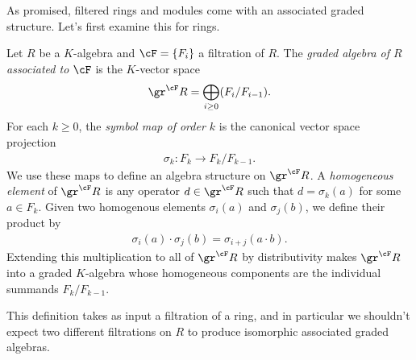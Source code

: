As promised, filtered rings and modules come with an associated graded structure. Let's first examine this for rings.

\begin{defn}\label{defn:associated-grading-rng}
	Let $R$ be a $K$-algebra and $\cF = \{F_i\}$ a filtration of $R$. The \emph{graded algebra of $R$ associated to $\cF$} is the $K$-vector space
	\begin{align*}
		\gr^\cF R = \bigoplus_{i\geq 0}(F_i/F_{i-1}).
	\end{align*}
	For each $k \geq 0$, the \emph{symbol map of order $k$} is the canonical vector space projection
	\begin{align*}
		\sigma_k:F_k\to F_k/F_{k-1}.
	\end{align*}
	We use these maps to define an algebra structure on $\gr^\cF R$. A \emph{homogeneous element} of $\gr^\cF R$ is any operator $d \in \gr^\cF R$ such that $d = \sigma_k(a)$ for some $a \in F_k$. Given two homogenous elements $\sigma_i(a)$ and $\sigma_j(b)$, we define their product by
	\begin{align*}
		\sigma_i(a)\cdot \sigma_j(b) = \sigma_{i+j}(a\cdot b).
	\end{align*}
	Extending this multiplication to all of $\gr^\cF R$ by distributivity makes $\gr^\cF R$ into a graded $K$-algebra whose homogeneous components are the individual summands $F_k/F_{k-1}$.
\end{defn}
This definition takes as input a filtration of a ring, and in particular we shouldn't expect two different filtrations on $R$ to produce isomorphic associated graded algebras.

